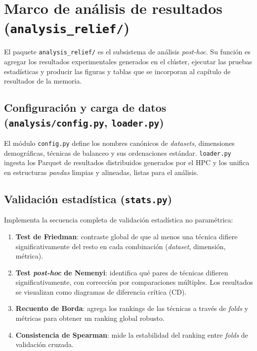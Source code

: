 \section{Marco de análisis de resultados
         (\texttt{analysis\_relief/})}
\label{sec:anexo_analisis}

El paquete \texttt{analysis\_relief/} es el subsistema de análisis
\textit{post-hoc}. Su función es agregar los resultados experimentales
generados en el clúster, ejecutar las pruebas estadísticas y producir
las figuras y tablas que se incorporan al capítulo de resultados de la
memoria.

\subsection{Configuración y carga de datos
            (\texttt{analysis/config.py}, \texttt{loader.py})}
\label{subsec:anexo_config}

El módulo \texttt{config.py} define los nombres canónicos de
\textit{datasets}, dimensiones demográficas, técnicas de balanceo y
sus ordenaciones estándar. \texttt{loader.py} ingesta los Parquet de
resultados distribuidos generados por el HPC y los unifica en
estructuras \textit{pandas} limpias y alineadas, listas para el
análisis.

\subsection{Validación estadística (\texttt{stats.py})}
\label{subsec:anexo_stats}

Implementa la secuencia completa de validación estadística no
paramétrica:

\begin{enumerate}
    \item \textbf{Test de Friedman}: contraste global de que al menos
    una técnica difiere significativamente del resto en cada combinación
    (\textit{dataset}, dimensión, métrica).
    \item \textbf{Test \textit{post-hoc} de Nemenyi}: identifica qué
    pares de técnicas difieren significativamente, con corrección por
    comparaciones múltiples. Los resultados se visualizan como diagramas
    de diferencia crítica (CD).
    \item \textbf{Recuento de Borda}: agrega los rankings de las
    técnicas a través de \textit{folds} y métricas para obtener un
    ranking global robusto.
    \item \textbf{Consistencia de Spearman}: mide la estabilidad del
    ranking entre \textit{folds} de validación cruzada.
\end{enumerate}


